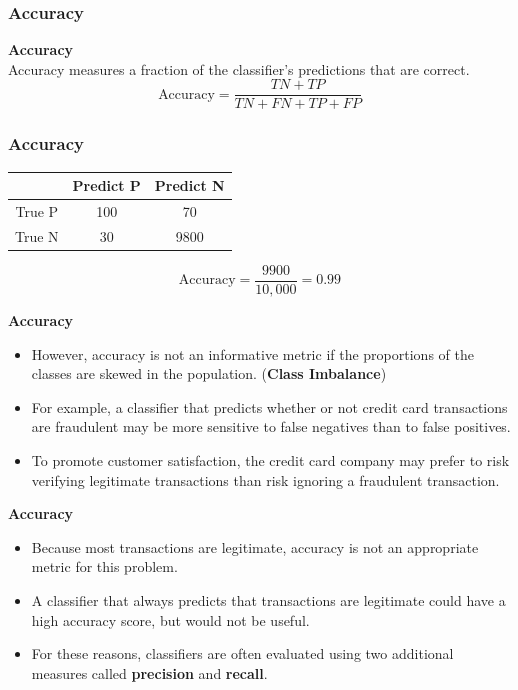 \documentclass[PredictiveAnalytics101.tex]{subfiles}
\begin{document}
\begin{frame}
\frametitle{Accuracy}
\textbf{Accuracy}\\
Accuracy measures a fraction of the classifier's predictions that are correct.
{\LARGE
\[ \mbox{Accuracy} =  \frac{TN + TP }{TN+FN+TP+FP}  \]
}
\end{frame}
\begin{frame}
\Large
\frametitle{Accuracy}
\begin{center}	
	\begin{tabular}{|c|c|c|}
		\hline  &  Predict P & Predict N  \\ 
		\hline True P  & 100 & 70  \\ 
		\hline True N & 30 & 9800 \\ 
		\hline 
	\end{tabular} 
\end{center}
\bigskip
{\LARGE
	\[ \mbox{Accuracy} =  \frac{9900 }{10,000} = 0.99  \]
}
\end{frame}
\begin{frame}
\Large
	\textbf{Accuracy}\\
\begin{itemize}
\item However, accuracy is not an informative metric if the proportions of
the classes are skewed in the population. (\textbf{Class Imbalance})
\item For example, a classifier that predicts
whether or not credit card transactions are fraudulent may be more sensitive to
false negatives than to false positives. 
\item To promote customer satisfaction, the credit
card company may prefer to risk verifying legitimate transactions than risk ignoring
a fraudulent transaction. 
\end{itemize}

\end{frame}
\begin{frame}
\Large
\textbf{Accuracy}\\
\begin{itemize}
\item Because most transactions are legitimate, accuracy is
not an appropriate metric for this problem.
\item  A classifier that always predicts that
transactions are legitimate could have a high accuracy score, but would not be
useful. 
\item For these reasons, classifiers are often evaluated using two additional
measures called \textbf{precision} and \textbf{recall}.
\end{itemize}

\end{frame}
\end{document}
